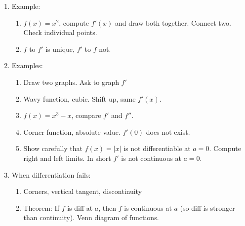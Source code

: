 \documentclass{article}
\begin{document}
\begin{enumerate}
\item Example:
\begin{enumerate}
\item $f(x)=x^2$, compute $f'(x)$ and draw both together. Connect two. Check individual points.
\item $f$ to $f'$ is unique, $f'$ to $f$ not.
\end{enumerate}

\item Examples:
\begin{enumerate}
\item Draw two graphs. Ask to graph $f'$
\item Wavy function, cubic. Shift up, same $f'(x)$. 
\item $f(x)=x^3-x$, compare $f'$ and $f''$.
\item Corner function, absolute value. $f'(0)$ does not exist. 
\item Show carefully that $f(x)=|x|$ is not differentiable at $a=0$. Compute right and left limits. In short $f'$ is not continuous at $a=0$.
\end{enumerate}

\item When differentiation fails:
\begin{enumerate}
\item Corners, vertical tangent, discontinuity
\item Theorem: If $f$ is diff at $a$, then $f$ is continuous at $a$ (so diff is stronger than continuity). Venn diagram of functions.

\end{enumerate}

\end{enumerate}


\end{document}
